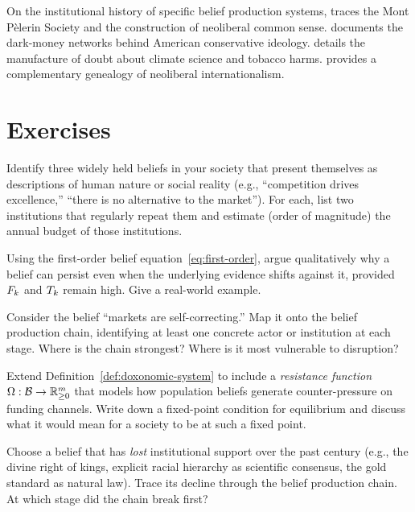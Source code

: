 On the institutional history of specific belief production systems, \textcite{mirowski2009} traces the Mont P\`{e}lerin Society and the construction of neoliberal common sense.
\textcite{mayer2016} documents the dark-money networks behind American conservative ideology.
\textcite{oreskes2010} details the manufacture of doubt about climate science and tobacco harms.
\textcite{slobodian2018} provides a complementary genealogy of neoliberal internationalism.


\section{Exercises}

\begin{exercise}
\label{ex:ch1-identify}
Identify three widely held beliefs in your society that present themselves as descriptions of human nature or social reality (e.g., ``competition drives excellence,'' ``there is no alternative to the market'').
For each, list two institutions that regularly repeat them and estimate (order of magnitude) the annual budget of those institutions.
\end{exercise}

\begin{exercise}
\label{ex:ch1-equation}
Using the first-order belief equation~\eqref{eq:first-order}, argue qualitatively why a belief can persist even when the underlying evidence shifts against it, provided $F_{k}$ and $T_{k}$ remain high.
Give a real-world example.
\end{exercise}

\begin{exercise}
\label{ex:ch1-chain}
Consider the belief ``markets are self-correcting.''
Map it onto the belief production chain, identifying at least one concrete actor or institution at each stage.
Where is the chain strongest?
Where is it most vulnerable to disruption?
\end{exercise}

\begin{exercise}
\label{ex:ch1-tuple}
Extend Definition~\ref{def:doxonomic-system} to include a \emph{resistance function} $\Omega: \mathcal{B} \to \mathbb{R}^m_{\geq 0}$ that models how population beliefs generate counter-pressure on funding channels.
Write down a fixed-point condition for equilibrium and discuss what it would mean for a society to be at such a fixed point.
\end{exercise}

\begin{exercise}
\label{ex:ch1-comparison}
Choose a belief that has \emph{lost} institutional support over the past century (e.g., the divine right of kings, explicit racial hierarchy as scientific consensus, the gold standard as natural law).
Trace its decline through the belief production chain.
At which stage did the chain break first?
\end{exercise}

